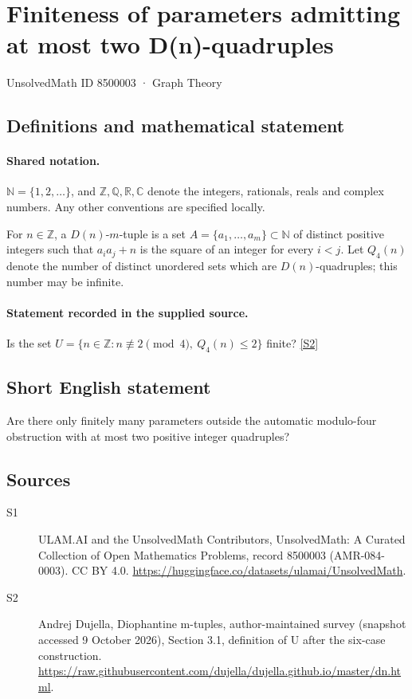 \documentclass[11pt]{article}
\newcommand{\sref}[2]{\hyperlink{source:#1:#2}{[S#2]}}
\begin{document}
\setcounter{section}{8500002}
\section{Finiteness of parameters admitting at most two D(n)-quadruples}\label{8500003}
{\small\sffamily UnsolvedMath ID 8500003 · Graph Theory}
\subsection{Definitions and mathematical statement}

\paragraph{Shared notation.}$\mathbb N=\{1,2,\ldots\}$, and $\mathbb Z,\mathbb Q,\mathbb R,\mathbb C$ denote the integers, rationals, reals and complex numbers. Any other conventions are specified locally.


For $n\in\mathbb Z$, a $D(n)$-$m$-tuple is a set $A=\{a_1,\ldots,a_m\}\subset\mathbb N$ of distinct positive integers such that $a_i a_j+n$ is the square of an integer for every $i<j$. Let $Q_4(n)$ denote the number of distinct unordered sets which are $D(n)$-quadruples; this number may be infinite.
\paragraph{Statement recorded in the supplied source.}
Is the set $U=\{n\in\mathbb Z:n\not\equiv2\pmod4,\ Q_4(n)\le2\}$ finite? \sref{8500003}{2}
\subsection{Short English statement}
Are there only finitely many parameters outside the automatic modulo-four obstruction with at most two positive integer quadruples?
\subsection{Sources}
\begin{description}
\item[\hypertarget{source:8500003:1}{S1}] ULAM.AI and the UnsolvedMath Contributors, UnsolvedMath: A Curated Collection of Open Mathematics Problems, record 8500003 (AMR-084-0003). CC BY 4.0. \url{https://huggingface.co/datasets/ulamai/UnsolvedMath}.
\item[\hypertarget{source:8500003:2}{S2}] Andrej Dujella, Diophantine m-tuples, author-maintained survey (snapshot accessed 9 October 2026), Section 3.1, definition of U after the six-case construction. \url{https://raw.githubusercontent.com/dujella/dujella.github.io/master/dn.html}.
\end{description}
\label{end:8500003}
\end{document}
